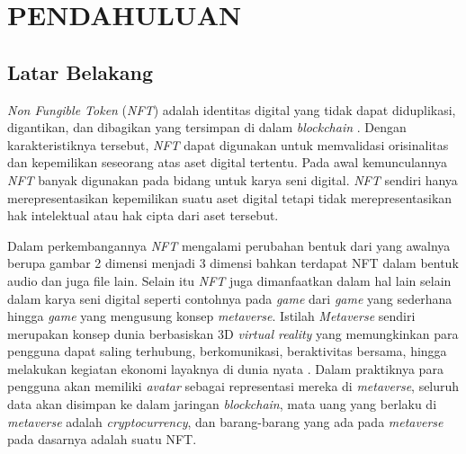 \chapter{PENDAHULUAN}

\section{Latar Belakang}

\emph{Non Fungible Token} (\emph{NFT}) adalah identitas digital yang tidak dapat diduplikasi, digantikan, dan dibagikan yang tersimpan di dalam \emph{blockchain} \parencite{BakerBradley}. 
Dengan karakteristiknya tersebut, \emph{NFT} dapat digunakan untuk memvalidasi orisinalitas dan kepemilikan seseorang atas aset digital tertentu. Pada awal kemunculannya \emph{NFT} banyak digunakan pada bidang untuk karya seni digital.  \emph{NFT} sendiri hanya merepresentasikan kepemilikan suatu aset digital tetapi tidak merepresentasikan hak intelektual atau hak cipta dari aset tersebut. 

Dalam perkembangannya \emph{NFT} mengalami perubahan bentuk dari yang awalnya berupa gambar 2 dimensi menjadi 3 dimensi bahkan terdapat NFT dalam bentuk audio dan juga file lain. 
Selain itu \emph{NFT} juga dimanfaatkan dalam hal lain selain dalam karya seni digital seperti contohnya pada \emph{game} dari \emph{game} yang sederhana hingga \emph{game} yang mengusung konsep \emph{metaverse}. Istilah \emph{Metaverse} sendiri merupakan konsep dunia berbasiskan 3D \emph{virtual reality} yang memungkinkan para pengguna dapat saling terhubung, berkomunikasi, beraktivitas bersama, hingga melakukan kegiatan ekonomi layaknya di dunia nyata \parencite{YohanHwang}. 
Dalam praktiknya para pengguna akan memiliki \emph{avatar} sebagai representasi mereka di \emph{metaverse}, seluruh data akan disimpan ke dalam jaringan \emph{blockchain}, mata uang yang berlaku di \emph{metaverse} adalah \emph{cryptocurrency}, dan barang-barang yang ada pada \emph{metaverse} pada dasarnya adalah suatu NFT.

